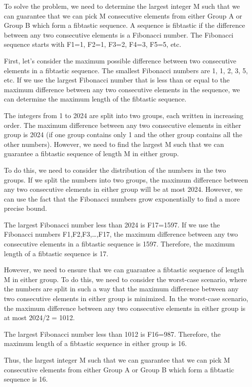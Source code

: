 To solve the problem, we need to determine the largest integer M such that we can guarantee that we can pick M consecutive elements from either Group A or Group B which form a fibtastic sequence. A sequence is fibtastic if the difference between any two consecutive elements is a Fibonacci number. The Fibonacci sequence starts with F1​=1, F2​=1, F3​=2, F4​=3, F5​=5, etc.

First, let's consider the maximum possible difference between two consecutive elements in a fibtastic sequence. The smallest Fibonacci numbers are 1, 1, 2, 3, 5, etc. If we use the largest Fibonacci number that is less than or equal to the maximum difference between any two consecutive elements in the sequence, we can determine the maximum length of the fibtastic sequence.

The integers from 1 to 2024 are split into two groups, each written in increasing order. The maximum difference between any two consecutive elements in either group is 2024 (if one group contains only 1 and the other group contains all the other numbers). However, we need to find the largest M such that we can guarantee a fibtastic sequence of length M in either group.

To do this, we need to consider the distribution of the numbers in the two groups. If we split the numbers into two groups, the maximum difference between any two consecutive elements in either group will be at most 2024. However, we can use the fact that the Fibonacci numbers grow exponentially to find a more precise bound.

The largest Fibonacci number less than 2024 is F17​=1597. If we use the Fibonacci numbers F1​,F2​,F3​,…,F17​, the maximum difference between any two consecutive elements in a fibtastic sequence is 1597. Therefore, the maximum length of a fibtastic sequence is 17.

However, we need to ensure that we can guarantee a fibtastic sequence of length M in either group. To do this, we need to consider the worst-case scenario, where the numbers are split in such a way that the maximum difference between any two consecutive elements in either group is minimized. In the worst-case scenario, the maximum difference between any two consecutive elements in either group is at most 2024/2 = 1012.

The largest Fibonacci number less than 1012 is F16​=987. Therefore, the maximum length of a fibtastic sequence in either group is 16.

Thus, the largest integer M such that we can guarantee that we can pick M consecutive elements from either Group A or Group B which form a fibtastic sequence is 16​.
